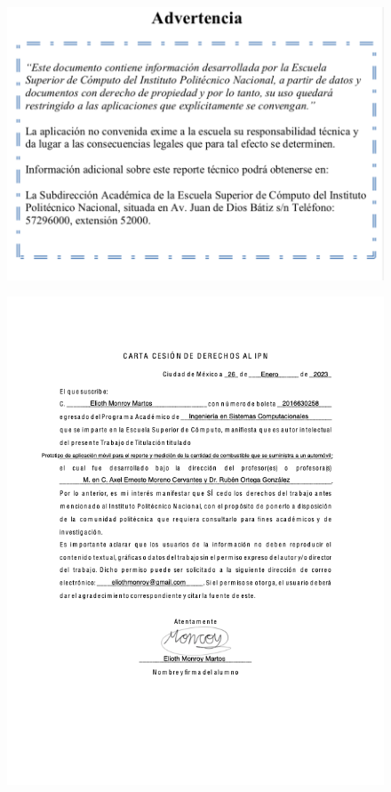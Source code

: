 \begin{alwayssingle}
	{
	\pagestyle{empty}
		\vspace{1.5cm}
		{
			\begin{figure}[H]
				\centering
				\includegraphics[scale=1.05]{Disco/advertencia}
			\end{figure}
		}
	}
\end{alwayssingle}

\begin{alwayssingle}
	{
	\pagestyle{empty}
		\vspace{1.5cm}
		{
			\begin{figure}[H]
				\centering
				\includegraphics[scale=.87]{DocumentoTecnico/Disco/carta_cesion.png}
			\end{figure}
		}
	}
\end{alwayssingle}
